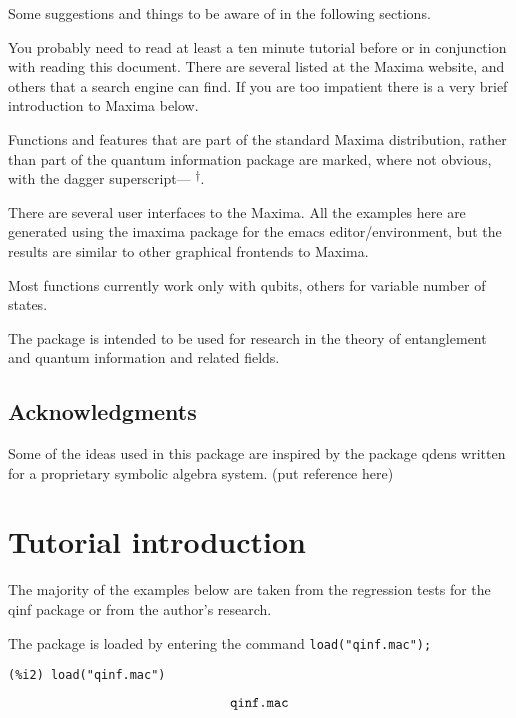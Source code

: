 \documentclass[leqno]{article}
\newcommand{\maxcom}{\textsuperscript{$\dagger$}}
\begin{document}
Some suggestions and things to be aware of in the following sections.
\begin{itemize}
  \begin{item}
    You probably need to read at least a ten minute tutorial before or in conjunction
    with reading this document. There are several listed at the Maxima website, and
    others that a search engine can find. If you are too impatient there is a very
    brief introduction to Maxima below.
  \end{item}
  \begin{item}
    Functions and features that are part of the standard Maxima distribution,
    rather than part of the quantum information
    package are marked, where not obvious, with the dagger superscript--- \maxcom.
  \end{item}
  \begin{item}
    There are several user interfaces to the Maxima. All the
    examples here are generated using the imaxima package
    for the emacs editor/environment, but the results are
    similar to other graphical frontends to Maxima.
  \end{item}
  \begin{item}
    Most functions currently work only with qubits, others for variable number of
    states.
  \end{item}
\end{itemize}

The package is intended to be used for research in the theory of entanglement
and quantum information and related fields. 

\subsection{Acknowledgments}

Some of the ideas used in this package are inspired by the package qdens
written for a proprietary symbolic algebra system. (put reference here)

\section{Tutorial introduction}

The majority of the examples below are taken from the regression tests for
the qinf package or from the author's research.

The package is loaded by entering the command
\texttt{load("qinf.mac");}
\begin{verbatim}
(%i2) load("qinf.mac")
\end{verbatim}
\begin{dmath}[number={\%o4}]
 \verb|qinf.mac|\end{dmath}
\end{document}

